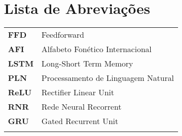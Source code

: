 \chapter{Lista de Abreviações}
\begin{tabular}{ll}
\vspace{3mm}
\textbf{FFD} 		 & Feedforward\\ 
\vspace{3mm}
\textbf{AFI} 		 & Alfabeto Fonético Internacional\\ \vspace{3mm}
\textbf{LSTM} 		 & Long-Short Term Memory\\ \vspace{3mm}
\textbf{PLN} 		 & Processamento de Linguagem Natural\\ 
\vspace{3mm}
\textbf{ReLU} 		 & Rectifier Linear Unit\\ \vspace{3mm}
\textbf{RNR} 		 & Rede Neural Recorrent\\ \vspace{3mm}
\textbf{GRU} 		 & Gated Recurrent Unit\\ 
\vspace{3mm}



\end{tabular}
